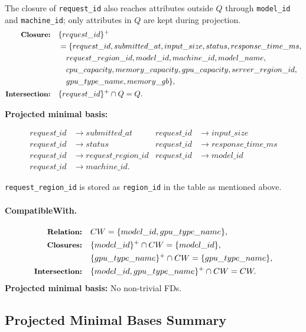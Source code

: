 \documentclass[11pt]{article}
\newcommand{\fd}{\rightarrow}
\newcommand{\code}[1]{\texttt{#1}}
\newcommand{\projlabel}[1]{\text{\small\bfseries #1}}
\begin{document}
The closure of \code{request\_id} also reaches attributes outside $Q$ through
\code{model\_id} and \code{machine\_id}; only attributes in $Q$ are kept during projection.
\begin{align*}
\projlabel{Closure:} &\quad \{request\_id\}^{+}\\
&\quad = \{request\_id, submitted\_at, input\_size, status, response\_time\_ms,\\
&\qquad request\_region\_id, model\_id, machine\_id, model\_name,\\
&\qquad cpu\_capacity, memory\_capacity, gpu\_capacity, server\_region\_id,\\
&\qquad gpu\_type\_name, memory\_gb\},\\
\projlabel{Intersection:} &\quad \{request\_id\}^{+} \cap Q = Q.
\end{align*}

\begin{center}
    \textbf{Projected minimal basis:}
\end{center}
\begin{align*}
request\_id &\fd submitted\_at & request\_id &\fd input\_size\\
request\_id &\fd status & request\_id &\fd response\_time\_ms\\
request\_id &\fd request\_region\_id & request\_id &\fd model\_id\\
request\_id &\fd machine\_id.&&
\end{align*}

\code{request\_region\_id} is stored as \code{region\_id} in the table as mentioned above.

\paragraph{CompatibleWith.}
\begin{align*}
\projlabel{Relation:} &\quad CW = \{model\_id, gpu\_type\_name\},\\
\projlabel{Closures:} &\quad \{model\_id\}^{+} \cap CW = \{model\_id\},\\
&\quad \{gpu\_type\_name\}^{+} \cap CW = \{gpu\_type\_name\},\\
\projlabel{Intersection:} &\quad \{model\_id, gpu\_type\_name\}^{+} \cap CW = CW.
\end{align*}
\noindent\textbf{Projected minimal basis:} No non-trivial FDs.

\subsection{Projected Minimal Bases Summary}
\end{document}
